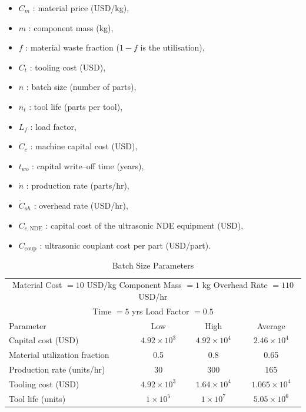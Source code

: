 \documentclass[11pt]{article}
\begin{document}
\begin{itemize}
  \item \(C_m\) : material price (USD/kg),
  \item \(m\) : component mass (kg),
  \item \(f\) : material waste fraction (\(1-f\) is the utilisation),
  \item \(C_t\) : tooling cost (USD),
  \item \(n\) : batch size (number of parts),
  \item \(n_t\) : tool life (parts per tool),
  \item \(L_f\) : load factor,
  \item \(C_c\) : machine capital cost (USD),
  \item \(t_{wo}\) : capital write–off time (years),
  \item \(\dot{n}\) : production rate (parts/hr),
  \item \(\dot{C}_{oh}\) : overhead rate (USD/hr),
  \item \(C_{c,\text{NDE}}\) : capital cost of the ultrasonic NDE equipment (USD),
  \item \(C_{\text{coup}}\) : ultrasonic couplant cost per part (USD/part).
\end{itemize}
\begin{table}[h]
\centering
\caption{Batch Size Parameters}
\begin{tabular}{@{}lccc@{}}
\multicolumn{4}{c}{Material Cost \(= 10\) USD/kg \quad
Component Mass \(= 1\) kg \quad
Overhead Rate \(= 110\) USD/hr} \\
\multicolumn{4}{c}{Time \(= 5\) yrs \quad
Load Factor \(= 0.5\)} \\
\hline
Parameter & Low & High & Average \\
\hline
Capital cost (USD)            & \(4.92 \times 10^{3}\) & \(4.92 \times 10^{4}\) & \(2.46 \times 10^{4}\) \\
Material utilization fraction & 0.5                    & 0.8                    & 0.65                   \\
Production rate (units/hr)    & 30                     & 300                    & 165                    \\
Tooling cost (USD)            & \(4.92 \times 10^{3}\) & \(1.64 \times 10^{4}\) & \(1.065 \times 10^{4}\) \\
Tool life (units)             & \(1 \times 10^{5}\)    & \(1 \times 10^{7}\)    & \(5.05 \times 10^{6}\) \\
\hline
\end{tabular}
\end{table}
\end{document}
